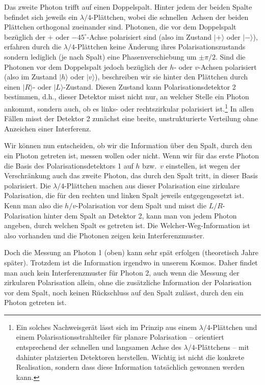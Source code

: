 Das zweite Photon trifft auf einen Doppelspalt. Hinter jedem der
beiden Spalte befindet sich jeweils ein $\lambda/4$-Pl\"attchen, wobei 
die \glq schnellen\grq\ Achsen der beiden Pl\"attchen orthogonal zueinander sind. 
Photonen, die vor dem Doppelspalt bez\"uglich der
$+$ oder $-45^\circ$-Achse polarisiert sind (also im Zustand
$|+\rangle$ oder $|-\rangle$), erfahren durch die
$\lambda/4$-Pl\"attchen keine \"Anderung ihres Polarisationszustands
sondern lediglich (je nach Spalt) eine Phasenverschiebung
um $\pm \pi/2$. Sind die Photonen vor dem Doppelspalt jedoch
bez\"uglich der $h$- oder $v$-Achsen polarisiert (also im Zustand
$|h\rangle$ oder $|v\rangle$), beschreiben wir sie hinter den Pl\"attchen durch
einen $|R\rangle$- oder $|L\rangle$-Zustand. Diesen Zustand kann
Polarisationsdetektor 2 bestimmen, d.h., dieser Detektor misst nicht nur,
an welcher Stelle ein Photon ankommt, sondern auch, ob es links- oder
rechtszirkular polarisiert ist.\footnote{Ein solches Nachweisger\"at l\"asst sich im Prinzip
aus einem $\lambda/4$-Pl\"attchen und einem Polarisationsstrahlteiler f\"ur
planare Polarisation -- orientiert entsprechend der schnellen und langsamen
Achse des $\lambda/4$-Pl\"attchens -- mit dahinter platzierten Detektoren herstellen. Wichtig ist
nicht die konkrete Realisation, sondern dass diese Information tats\"achlich
gewonnen werden kann.} 
In allen F\"allen misst der Detektor 2 zun\"achst
eine breite, unstrukturierte Verteilung ohne Anzeichen einer Interferenz.

 Wir k\"onnen nun entscheiden, ob wir die Information \"uber
 den Spalt, durch den ein Photon getreten ist, messen wollen
 oder nicht. Wenn wir f\"ur das erste Photon die Basis
 des Polarisationsdetektors 1 auf $h$ bzw.\ $v$
 einstellen, ist wegen der Verschr\"ankung 
 auch das zweite Photon, das durch den Spalt
 tritt, in dieser Basis polarisiert. Die $\lambda/4$-Pl\"attchen
 machen aus dieser Polarisation eine zirkulare Polarisation,
 die f\"ur den rechten und linken Spalt jeweils entgegengesetzt
 ist. Kenn man also die $h/v$-Polarisation vor dem Spalt und
 misst die $L/R$-Polarisation hinter dem Spalt an Detektor 2, 
 kann man von jedem Photon angeben,
 durch welchen Spalt es getreten ist. Die \glq Welcher-Weg\grq-Information
 ist also vorhanden und die Photonen zeigen kein
 Interferenzmuster.
 
 Doch die Messung an Photon 1 (oben) kann sehr sp\"at erfolgen
(theoretisch Jahre sp\"ater). Trotzdem ist die Information \glqq irgendwo in unserem
Kosmos\grqq. Daher findet man auch kein 
Interferenzmuster f\"ur Photon 2, auch wenn die Messung der
 zirkularen Polarisation allein, ohne die zus\"atzliche Information der
 Polarisation vor dem Spalt, noch keinen
 R\"uckschluss auf den Spalt zul\"asst, durch den ein Photon
 getreten ist. 
 

